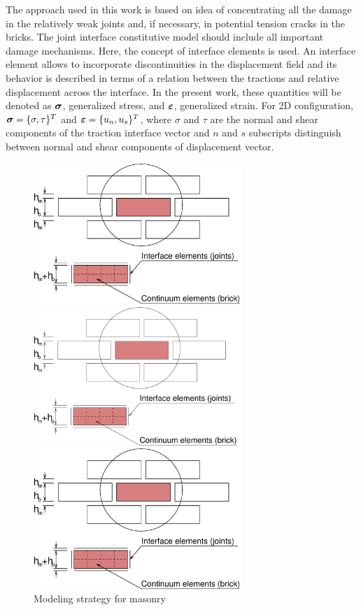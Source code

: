 \documentclass[a4paper]{article}
\newcommand{\mbf}[1]{\mbox{\boldmath$#1$}}
\newcommand{\e}{\mbf{\varepsilon}}
\newcommand{\sig}{\mbf{\sigma}}
\begin{document}
The approach used in this work is based on idea of concentrating all the damage in the relatively weak joints and, if necessary, in potential tension cracks in the bricks. The joint interface constitutive model should include all important damage mechanisms. Here, the  concept of interface elements is used. An interface element allows to incorporate discontinuities in the displacement field and its behavior is described in terms of a relation between the tractions and relative displacement across the interface. In the present work, these quantities will be denoted as $\sig$, generalized stress, and $\e$, generalized strain. For 2D configuration, $\sig=\{\sigma, \tau\}^T$ and $\e=\{u_n, u_s\}^T$, where $\sigma$ and $\tau$ are the normal and shear components of the traction interface vector and  $n$ and $s$ subscripts distinguish between normal and shear components of displacement vector.
\begin{figure}[!htb]
\begin{htmlonly}
  \centerline{\includegraphics[width=0.7\textwidth]{mmodel.eps}}
\end{htmlonly}
\ifpdf
 \centerline{\includegraphics[width=0.7\textwidth]{mmodel.pdf}}
\else
 \centerline{\includegraphics[width=0.7\textwidth]{mmodel.eps}}
\fi
  \caption{Modeling strategy for masonry}
\end{figure}
\end{document}
